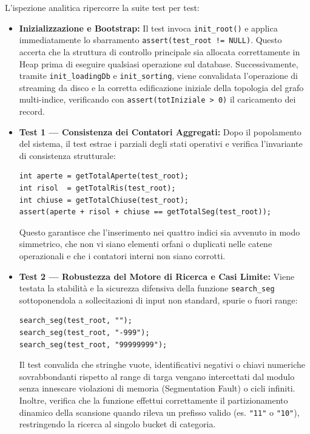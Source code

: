 \documentclass[12pt, a4paper]{article}
\begin{document}
L'ispezione analitica ripercorre la suite test per test:
\begin{itemize}[leftmargin=*]
    \item \textbf{Inizializzazione e Bootstrap:} Il test invoca \texttt{init\_root()} e applica immediatamente lo sbarramento \texttt{assert(test\_root != NULL)}. Questo accerta che la struttura di controllo principale sia allocata correttamente in Heap prima di eseguire qualsiasi operazione sul database. Successivamente, tramite \texttt{init\_loadingDb} e \texttt{init\_sorting}, viene convalidata l'operazione di streaming da disco e la corretta edificazione iniziale della topologia del grafo multi-indice, verificando con \texttt{assert(totIniziale > 0)} il caricamento dei record.
    
    \item \textbf{Test 1 --- Consistenza dei Contatori Aggregati:} Dopo il popolamento del sistema, il test estrae i parziali degli stati operativi e verifica l'invariante di consistenza strutturale:
\begin{lstlisting}[style=cstyle, numbers=none]
int aperte = getTotalAperte(test_root);
int risol  = getTotalRis(test_root);
int chiuse = getTotalChiuse(test_root);
assert(aperte + risol + chiuse == getTotalSeg(test_root));
\end{lstlisting}
    Questo garantisce che l'inserimento nei quattro indici sia avvenuto in modo simmetrico, che non vi siano elementi orfani o duplicati nelle catene operazionali e che i contatori interni non siano corrotti.
    
    \item \textbf{Test 2 --- Robustezza del Motore di Ricerca e Casi Limite:} Viene testata la stabilità e la sicurezza difensiva della funzione \texttt{search\_seg} sottoponendola a sollecitazioni di input non standard, spurie o fuori range:
\begin{lstlisting}[style=cstyle, numbers=none]
search_seg(test_root, "");
search_seg(test_root, "-999");
search_seg(test_root, "99999999");
\end{lstlisting}
    Il test convalida che stringhe vuote, identificativi negativi o chiavi numeriche sovrabbondanti rispetto al range di targa vengano intercettati dal modulo senza innescare violazioni di memoria (Segmentation Fault) o cicli infiniti. Inoltre, verifica che la funzione effettui correttamente il partizionamento dinamico della scansione quando rileva un prefisso valido (es. \texttt{"11"} o \texttt{"10"}), restringendo la ricerca al singolo bucket di categoria.
    

\end{itemize}
\end{document}
